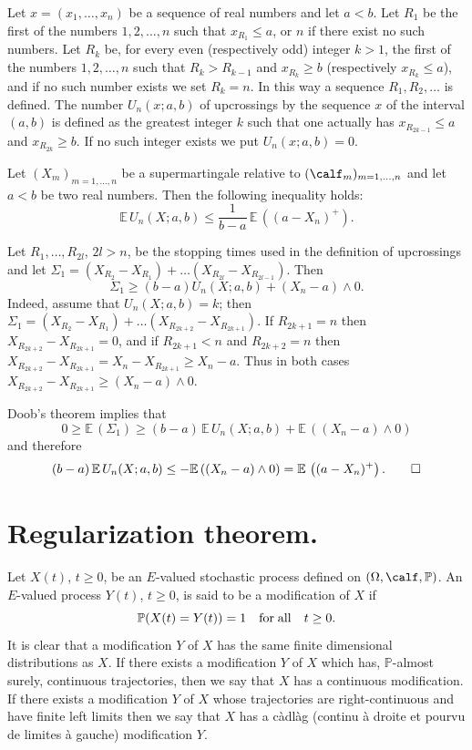 \documentclass[preprint]{imsart}
\def\P{\mathbb P}
\def\E{\mathbb E}
\begin{document}
{Let $x=(x_1,\ldots, x_n)$ be a sequence of real numbers and let
$a<b$. Let $R_1$ be the first of the numbers $1,2,\ldots, n$ such
that $x_{R_1}\le a$, or $n$ if there exist no such numbers.
Let $R_k$ be, for every even (respectively odd) integer $k>1$, the
first of the numbers $1,2,\ldots, n$ such
that $R_k>R_{k-1}$ and $x_{R_k}\ge b$ (respectively $x_{R_k}\le
a$), and if no such number exists we set $R_k=n$. In this way a
sequence $R_1,R_2,\ldots $ is defined. The number $U_n(x;a,b)$
of upcrossings
by the sequence $x$  of the interval $(a,b)$ is defined as the
greatest integer $k$ such that one actually has
$x_{R_{2k-1}}\le a$ and $x_{R_{2k}}\ge b$. If no such integer
exists we put $U_n(x;a,b)=0$.


\begin{Theorem}\label{doobupcrossing}
  Let $(X_m)_{m=1,\ldots ,n}$ be a supermartingale
  relative to
  $(\calf_m)_{m=1,\ldots ,n}$ and let $a<b$ be two real numbers.
  Then the following inequality holds:
  $$
  \E\, U_n(X;a,b) \le \frac{1}{b-a}\,\E\, \left((a-X_n)^+\right).
  $$
\end{Theorem}

 Let $R_1,\ldots , R_{2l}$, $2l>n$,
be the stopping times used in the definition of upcrossings and
let $\Sigma_1= (X_{R_2}-X_{R_1})+\ldots
(X_{R_{2l}}-X_{R_{2l-1}})$. Then
$$
\Sigma_1\ge  (b-a)U_n(X;a,b)+(X_n-a)\wedge 0.
$$
Indeed, assume that $U_n(X;a,b)=k$; then
$\Sigma_1= (X_{R_2}-X_{R_1})+\ldots
(X_{R_{2k+2}}-X_{R_{2k+1}})$.
If $R_{2k+1}=n$ then $X_{R_{2k+2}}-X_{R_{2k+1}}=0$, and
if $R_{2k+1}<n$ and $R_{2k+2}=n$ then
$X_{R_{2k+2}}-X_{R_{2k+1}}=X_{n}-X_{R_{2k+1}}\ge X_n-a$. Thus in
both cases
$X_{R_{2k+2}}-X_{R_{2k+1}}\ge (X_n-a)\wedge 0$.

Doob's theorem implies that
$$
0\ge \E\, (\Sigma_1) \ge (b-a)\,\E\,  U_n(X;a,b)
+\E\, ((X_n-a)\wedge 0)
$$
and therefore
$$
(b-a)\,\E\,  U_n(X;a,b)\le - \E\, ((X_n-a)\wedge 0)
=\E\, \left((a-X_n)^+\right).
\qed
$$



\section{Regularization theorem.}


Let $X(t)$, $t\ge 0$, be an $E$-valued stochastic process defined
on $(\Omega,\calf,\P)$. An $E$-valued process
$Y(t)$, $t\ge 0$, is said to be a modification of $X$ if
$$
\P(X(t)=Y(t))=1\quad {\rm for\; all\quad } t\ge0.
$$
It is clear that a modification $Y$ of $X$ has the same finite
dimensional distributions as $X$. If there exists a modification
$Y$ of $X$ which has, $\P$-almost surely, continuous trajectories,
then we say that $X$ has a continuous modification. If there
exists a modification
$Y$ of $X$ whose  trajectories are right-continuous and have
finite left limits
then we say that $X$ has a c\`adl\`ag (continu \`a droite
et pourvu de limites \`a gauche) modification $Y$.

}
\end{document}
